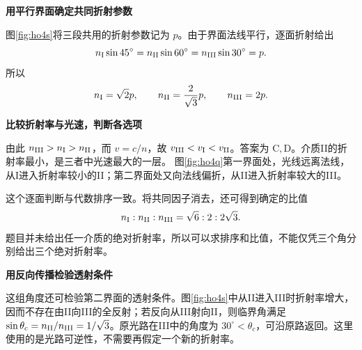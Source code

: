 \begin{solution}\textbf{用平行界面确定共同折射参数}\par\nobreak
图\ref{fig:ho4s}将三段共用的折射参数记为 $p$。由于界面法线平行，逐面折射给出
\[
n_{\rm I}\sin45^\circ=n_{\rm II}\sin60^\circ
=n_{\rm III}\sin30^\circ=p.
\]
所以
\[
n_{\rm I}=\sqrt2p,\qquad n_{\rm II}=\frac2{\sqrt3}p,
\qquad n_{\rm III}=2p.
\]



\par\medskip{}\noindent\textbf{比较折射率与光速，判断各选项}\par\nobreak
由此 $n_{\rm III}>n_{\rm I}>n_{\rm II}$，而 $v=c/n$，故 $v_{\rm III}<v_{\rm I}<v_{\rm II}$。答案为 $\boxed{\mathrm C,\mathrm D}$。介质II的折射率最小，是三者中光速最大的一层。
图\ref{fig:ho4q}第一界面处，光线远离法线，从I进入折射率较小的II；第二界面处又向法线偏折，从II进入折射率较大的III。

这个逐面判断与代数排序一致。将共同因子消去，还可得到确定的比值
\[
n_{\rm I}:n_{\rm II}:n_{\rm III}=\sqrt6:2:2\sqrt3.
\]
题目并未给出任一介质的绝对折射率，所以可以求排序和比值，不能仅凭三个角分别给出三个绝对折射率。



\par\medskip{}\noindent\textbf{用反向传播检验透射条件}\par\nobreak
这组角度还可检验第二界面的透射条件。图\ref{fig:ho4s}中从II进入III时折射率增大，因而不存在由II向III的全反射；若反向从III射向II，则临界角满足
\(\sin\theta_c=n_{\rm II}/n_{\rm III}=1/\sqrt3\)。原光路在III中的角度为 \(30^\circ<\theta_c\)，可沿原路返回。这里使用的是光路可逆性，不需要再假定一个新的折射率。
\end{solution}

